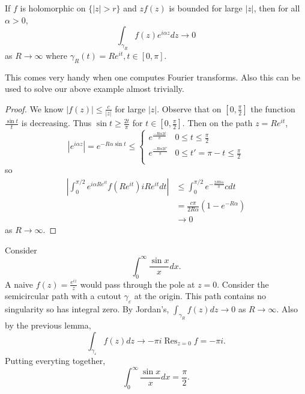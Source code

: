\documentclass[a4paper]{article}
\DeclareMathOperator*{\res}{Res}
\begin{document}
\begin{lemma}[Jordan]
  If \(f\) is holomorphic on \(\{|z| > r\}\) and \(zf(z)\) is bounded for large \(|z|\), then for all \(\alpha > 0\),
  \[
    \int_{\gamma_R} f(z)e^{i\alpha z} dz \to 0
  \]
  as \(R \to \infty\) where \(\gamma_R(t) = Re^{it}, t \in [0, \pi]\).
\end{lemma}

This comes very handy when one computes Fourier transforms. Also this can be used to solve our above example almost trivially.

\begin{proof}
  We know \(|f(z)| \leq \frac{c}{|z|}\) for large \(|z|\). Observe that on \([0, \frac{\pi}{2}]\) the function \(\frac{\sin t}{t}\) is decreasing. Thus \(\sin t \geq \frac{2t}{\pi}\) for \(t \in [0, \frac{\pi}{2}]\). Then on the path \(z = Re^{it}\),
  \[
    |e^{i\alpha z}| = e^{-R\alpha\sin t} \leq
    \begin{cases}
      e^{\frac{-R\alpha 2t}{\pi}} & 0 \leq t \leq \frac{\pi}{2} \\
      e^{\frac{-R\alpha 2t'}{\pi}} & 0 \leq t' = \pi - t \leq \frac{\pi}{2} \\
    \end{cases}
  \]
so
\begin{align*}
  \left| \int_0^{\pi/2} e^{i\alpha R e^{it}} f(Re^{it}) iRe^{it} dt \right|
  &\leq \int_0^{\pi/2} e^{-\frac{2Rt\alpha}{\pi}}c dt \\
  &= \frac{c\pi}{2R \alpha} (1 - e^{-R \alpha}) \\
  &\to 0
\end{align*}
as \(R \to \infty\).
\end{proof}

\begin{eg}
  Consider
  \[
    \int_0^\infty \frac{\sin x}{x} dx.
  \]
  A naive \(f(z) = \frac{e^{iz}}{z}\) would pass through the pole at \(z = 0\). Consider the semicircular path with a cutout \(\gamma_\varepsilon\) at the origin. This path contains no singularity so has integral zero. By Jordan's, \(\int_{\gamma_R} f(z) dz \to 0\) as \(R \to \infty\). Also by the previous lemma,
  \[
    \int_{\gamma_\varepsilon} f(z) dz \to - \pi i \res_{z = 0} f = -\pi i.
  \]
  Putting everyting together,
  \[
    \int_0^\infty \frac{\sin x}{x} dx = \frac{\pi}{2}.
  \]
\end{eg}
\end{document}
